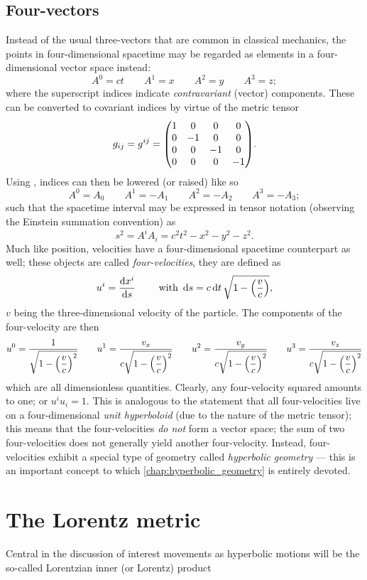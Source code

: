 \subsection{Four-vectors}
Instead of the usual three-vectors that are common in classical mechanics, the points in four-dimensional spacetime may be regarded as elements in a four-dimensional vector space instead:
\begin{equation}
    A^0 = ct\qquad A^1 = x \qquad A^2 = y \qquad A^3 = z;
    \label{eq:four-vector}
\end{equation}
where the superscript indices indicate \emph{contravariant} (vector) components. These can be converted to covariant indices by virtue of the metric tensor 
\[g_{ij} = g^{ij} = \mqty(\dmat[0]{1, -1, -1, -1}).\]
Using , indices can then be lowered (or raised) like so
\[ A^0 = A_0\qquad A^1 = -A_1 \qquad A^2 = -A_2 \qquad A^3 = -A_3; \]
such that the spacetime interval may be expressed in tensor notation (observing the Einstein summation convention) as
\[ s^2 = A^i A_i = c^2t^2 - x^2 - y^2 - z^2.\]
Much like position, velocities have a four-dimensional spacetime counterpart as well; these objects are called \emph{four-velocities}, they are defined as \cite{Landau1971}
\[ u^i = \dv{x^i}{s} \qquad \text{ with } \dd{s} = c\dd{t} \sqrt{1 - \qty(\frac{v}{c})},\]
\(v\) being the three-dimensional velocity of the particle. The components of the four-velocity are then
\[ 
u^0 = \frac{\displaystyle 1}{\displaystyle \sqrt{1 - \qty(\frac{v}{c})^2}} 
\qquad  u^1 = \frac{\displaystyle v_x}{\displaystyle c\sqrt{1 - \qty(\frac{v}{c})^2}}
\qquad  u^2 = \frac{\displaystyle v_y}{\displaystyle c\sqrt{1 - \qty(\frac{v}{c})^2}}
\qquad  u^3 = \frac{\displaystyle v_z}{\displaystyle c\sqrt{1 - \qty(\frac{v}{c})^2}}
\]
which are all dimensionless quantities. Clearly, any four-velocity squared amounts to one; or \(u^i u_i = 1\). This is analogous to the statement that all four-velocities live on a four-dimensional \emph{unit hyperboloid} (due to the nature of the metric tensor); this means that the four-velocities \emph{do not} form a vector space; the sum of two four-velocities does not generally yield another four-velocity. Instead, four-velocities exhibit a special type of geometry called \emph{hyperbolic geometry} --- this is an important concept to which \cref{chap:hyperbolic_geometry} is entirely devoted.

\section{The Lorentz metric}
\label{sec:lorentz_metric}
Central in the discussion of interest movements as hyperbolic motions will be the so-called Lorentzian inner (or Lorentz) product

